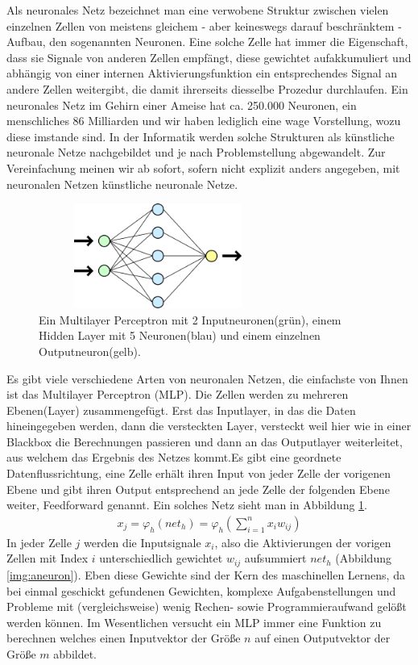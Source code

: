 Als neuronales Netz bezeichnet man eine verwobene Struktur zwischen vielen einzelnen Zellen von meistens gleichem - aber keineswegs darauf beschr\"anktem - Aufbau, den sogenannten Neuronen. Eine solche Zelle hat immer die Eigenschaft, dass sie Signale von anderen Zellen empfängt, diese gewichtet aufakkumuliert und abhängig von einer internen Aktivierungsfunktion ein entsprechendes Signal an andere Zellen weitergibt, die damit ihrerseits diesselbe Prozedur durchlaufen. Ein neuronales Netz im Gehirn einer Ameise hat ca. 250.000 Neuronen, ein menschliches 86 Milliarden \cite{bib:number} und wir haben lediglich eine wage Vorstellung, wozu diese imstande sind. In der Informatik werden solche Strukturen als künstliche neuronale Netze nachgebildet und je nach Problemstellung abgewandelt. Zur Vereinfachung meinen wir ab sofort, sofern nicht explizit anders angegeben, mit neuronalen Netzen künstliche neuronale Netze.
\begin{figure}
	\centering
	\includegraphics[width=0.7\textwidth, height=130px]{pics/MLP.png}	
	\caption{Ein Multilayer Perceptron mit 2 Inputneuronen(grün), einem Hidden Layer mit 5 Neuronen(blau) und einem einzelnen Outputneuron(gelb).   \cite{bib:mlp}}
	\label{img:mlp}
\end{figure}
Es gibt viele verschiedene Arten von neuronalen Netzen, die einfachste von Ihnen ist das Multilayer Perceptron (MLP). Die Zellen werden zu mehreren Ebenen(Layer) zusammengefügt. Erst das Inputlayer, in das die Daten hineingegeben werden, dann die versteckten Layer, versteckt weil hier wie in einer Blackbox die Berechnungen passieren und dann an das Outputlayer weiterleitet, aus welchem das Ergebnis des Netzes kommt.Es gibt eine geordnete Datenflussrichtung, eine Zelle erhält ihren Input von jeder Zelle der vorigenen Ebene und gibt ihren Output entsprechend an jede Zelle der folgenden Ebene weiter, Feedforward genannt. Ein solches Netz sieht man in Abbildung \ref{img:mlp}.  
\begin{gather}
x_{j} = \varphi_{h}(net_{h}) = \varphi_{h}(\sum_{i=1}^{n} x_{i}w_{ij}) 
\label{eq:act}
\end{gather}
In jeder Zelle \(j\) werden die Inputsignale \(x_{i}\), also die Aktivierungen der vorigen Zellen mit Index \(i\) unterschiedlich gewichtet \(w_{ij}\) aufsummiert \(net_{h}\) (Abbildung \ref{img:aneuron}).  Eben diese Gewichte sind der Kern des maschinellen Lernens, da bei einmal geschickt gefundenen Gewichten, komplexe Aufgabenstellungen und Probleme mit (vergleichsweise) wenig Rechen- sowie Programmieraufwand gelößt werden können. Im Wesentlichen versucht ein MLP immer eine Funktion zu berechnen welches einen Inputvektor der Größe \(n\) auf einen Outputvektor der Größe \(m\) abbildet.
